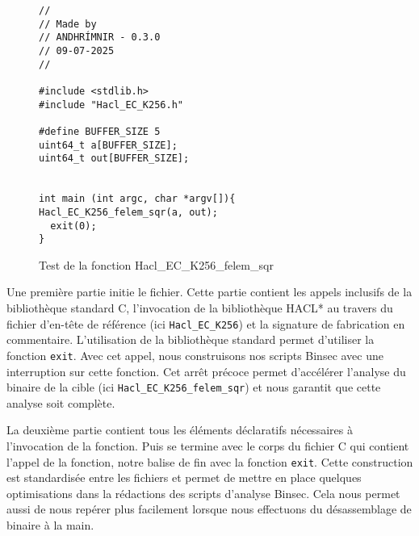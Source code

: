 \begin{figure}[!ht]
  \caption{Test de la fonction Hacl\_EC\_K256\_felem\_sqr}
  \label{fig:gen_test_simple}
  \begin{verbatim}
//
// Made by
// ANDHRÍMNIR - 0.3.0
// 09-07-2025
//

#include <stdlib.h>
#include "Hacl_EC_K256.h"

#define BUFFER_SIZE 5
uint64_t a[BUFFER_SIZE];
uint64_t out[BUFFER_SIZE];


int main (int argc, char *argv[]){
Hacl_EC_K256_felem_sqr(a, out);
  exit(0);
}   
  \end{verbatim}

\end{figure}

Une première partie initie le fichier. Cette partie contient les appels inclusifs de la bibliothèque standard C, l'invocation de la bibliothèque HACL* au travers du fichier d'en-tête de référence (ici \texttt{Hacl\_EC\_K256}) et la signature de fabrication en commentaire. L'utilisation de la bibliothèque standard permet d'utiliser la fonction \texttt{exit}. Avec cet appel, nous construisons nos scripts Binsec avec une interruption sur cette fonction. Cet arrêt précoce permet d'accélérer l'analyse du binaire de la cible (ici \texttt{Hacl\_EC\_K256\_felem\_sqr}) et nous garantit que cette analyse soit complète.\smallbreak

La deuxième partie contient tous les éléments déclaratifs nécessaires à l'invocation de la fonction. Puis se termine avec le corps du fichier C qui contient l'appel de la fonction, notre balise de fin avec la fonction \texttt{exit}. Cette construction est standardisée entre les fichiers et permet de mettre en place quelques optimisations dans la rédactions des scripts d'analyse Binsec. Cela nous permet aussi de nous repérer plus facilement lorsque nous effectuons du désassemblage de binaire à la main.


